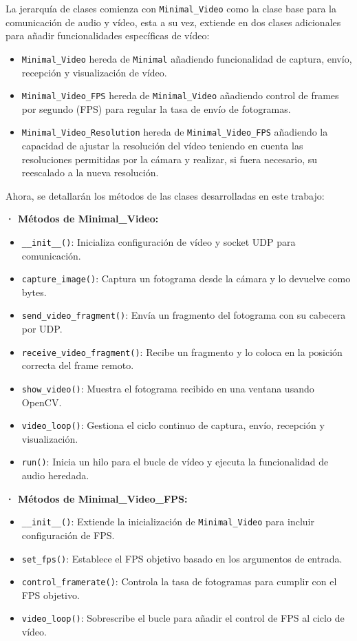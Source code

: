 La jerarquía de clases comienza con \texttt{Minimal\_Video} como la clase base para la comunicación de audio y vídeo, esta a su vez, extiende en dos clases adicionales para añadir funcionalidades específicas de vídeo:
\begin{itemize} 
    \item \texttt{Minimal\_Video} hereda de \texttt{Minimal} añadiendo funcionalidad de captura, envío, recepción y visualización de vídeo. 
    \item \texttt{Minimal\_Video\_FPS} hereda de \texttt{Minimal\_Video} añadiendo control de frames por segundo (FPS) para regular la tasa de envío de fotogramas.
    \item \texttt{Minimal\_Video\_Resolution} hereda de \texttt{Minimal\_Video\_FPS} añadiendo la capacidad de ajustar la resolución del vídeo teniendo en cuenta las resoluciones permitidas por la cámara y realizar, si fuera necesario, su reescalado a la nueva resolución.
\end{itemize}

Ahora, se detallarán los métodos de las clases desarrolladas en este trabajo:
\vspace{\baselineskip}

\textbf{· Métodos de Minimal\_Video:} 
\begin{itemize} 
    \item \texttt{\_\_init\_\_()}: Inicializa configuración de vídeo y socket UDP para comunicación. 
    \item \texttt{capture\_image()}: Captura un fotograma desde la cámara y lo devuelve como bytes. 
    \item \texttt{send\_video\_fragment()}: Envía un fragmento del fotograma con su cabecera por UDP. 
    \item \texttt{receive\_video\_fragment()}: Recibe un fragmento y lo coloca en la posición correcta del frame remoto. 
    \item \texttt{show\_video()}: Muestra el fotograma recibido en una ventana usando OpenCV. 
    \item \texttt{video\_loop()}: Gestiona el ciclo continuo de captura, envío, recepción y visualización. 
    \item \texttt{run()}: Inicia un hilo para el bucle de vídeo y ejecuta la funcionalidad de audio heredada. 
\end{itemize}

\textbf{· Métodos de Minimal\_Video\_FPS:} 
\begin{itemize} 
    \item \texttt{\_\_init\_\_()}: Extiende la inicialización de \texttt{Minimal\_Video} para incluir configuración de FPS. 
    \item \texttt{set\_fps()}: Establece el FPS objetivo basado en los argumentos de entrada. 
    \item \texttt{control\_framerate()}: Controla la tasa de fotogramas para cumplir con el FPS objetivo.
    \item \texttt{video\_loop()}: Sobrescribe el bucle para añadir el control de FPS al ciclo de vídeo. 
\end{itemize}


